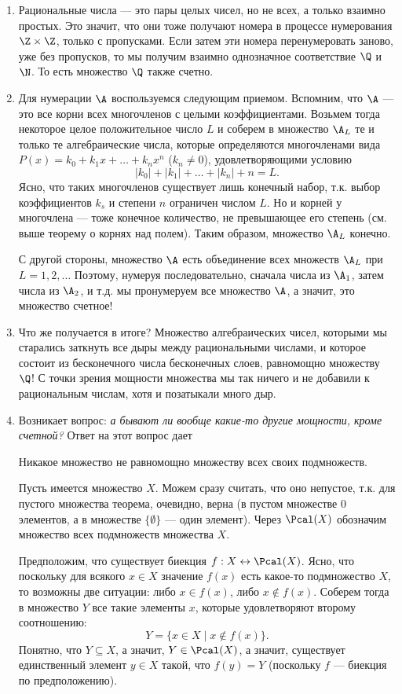 \begin{enumerate}
\item Рациональные числа --- это пары целых чисел, но не всех, а только взаимно простых. Это значит, что они тоже получают номера в процессе нумерования $\Z\times\Z$, только с пропусками. Если затем эти номера перенумеровать заново, уже без пропусков, то мы получим взаимно однозначное соответствие $\Q$ и $\N$. То есть множество $\Q$ также счетно.
\item Для нумерации $\A$ воспользуемся следующим приемом. Вспомним, что $\A$ --- это все корни всех многочленов с целыми коэффициентами. Возьмем тогда некоторое целое положительное число $L$ и соберем в множество $\A_L$ те и только те алгебраические числа, которые определяются многочленами вида $P(x)=k_0+k_1x+\dots+k_nx^n$ ($k_n\ne 0$), удовлетворяющими условию
$$
|k_0|+|k_1|+\dots+|k_n|+n=L.
$$
Ясно, что таких многочленов существует лишь конечный набор, т.к. выбор коэффициентов $k_s$ и степени $n$ ограничен числом $L$. Но и корней у многочлена --- тоже конечное количество, не превышающее его степень (см. выше теорему о корнях над полем). Таким образом, множество $\A_L$ конечно.

С другой стороны, множество $\A$ есть объединение всех множеств $\A_L$ при $L=1,2,\dots$ Поэтому, нумеруя последовательно, сначала числа из $\A_1$, затем числа из $\A_2$, и т.д. мы пронумеруем все множество $\A$, а значит, это множество счетное!

\item Что же получается в итоге? Множество алгебраических чисел, которыми мы старались заткнуть все дыры между рациональными числами, и которое состоит из бесконечного числа бесконечных слоев, равномощно множеству $\Q$! С точки зрения мощности множества мы так ничего и не добавили к рациональным числам, хотя и позатыкали много дыр.
\item Возникает вопрос: \textit{а бывают ли вообще какие-то другие мощности, кроме счетной?} Ответ на этот вопрос дает
\begin{thrm}[Кантора]
Никакое множество не равномощно множеству всех своих подмножеств.
\end{thrm}
\pf
Пусть имеется множество $X$. Можем сразу считать, что оно непустое, т.к. для пустого множества теорема, очевидно, верна (в пустом множестве 0 элементов, а в множестве $\{\emptyset\}$ --- один элемент). Через $\Pcal(X)$ обозначим множество всех подмножеств множества $X$.

Предположим, что существует биекция $f:X\leftrightarrow\Pcal(X)$. Ясно, что поскольку для всякого $x\in X$ значение $f(x)$ есть какое-то подмножество $X$, то возможны две ситуации: либо $x\in f(x)$, либо $x\notin f(x)$. Соберем тогда в множество $Y$ все такие элементы $x$, которые удовлетворяют второму соотношению:
$$
Y=\{x\in X\mid x\notin f(x)\}.
$$
Понятно, что $Y\subseteq X$, а значит, $Y\in\Pcal(X)$, а значит, существует единственный элемент $y\in X$ такой, что $f(y)=Y$ (поскольку $f$ --- биекция по предположению).


\end{enumerate}
